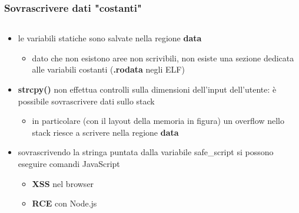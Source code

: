 \documentclass{beamer}
\newcommand\Fontvi{\fontsize{9.5}{7.2}\selectfont}
\begin{document}
\begin{frame}
  \frametitle{Sovrascrivere dati "costanti"}
  \Fontvi
  \begin{columns}
    \begin{column}{0.55\textwidth}
      \begin{itemize}
        \item le variabili statiche sono salvate nella regione \textbf{data}
        \begin{itemize}
          \item dato che non esistono aree non scrivibili, non esiste una
            sezione dedicata alle variabili costanti (\textbf{.rodata} negli ELF)
        \end{itemize}
      \item \textbf{strcpy()} non effettua controlli sulla dimensioni dell'input
          dell'utente: è possibile sovrascrivere dati sullo stack
        \begin{itemize}
          \item in particolare (con il layout della memoria in figura) un
            overflow nello stack riesce a scrivere nella regione \textbf{data}
        \end{itemize}
        \item sovrascrivendo la stringa puntata dalla variabile safe\_script si
          possono eseguire comandi JavaScript
        \begin{itemize}
          \item \textbf{XSS} nel browser
          \item \textbf{RCE} con Node.js
        \end{itemize}


\end{itemize}
\end{column}
\end{columns}
\end{frame}
\end{document}
